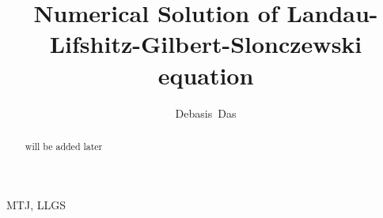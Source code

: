 \documentclass[review]{elsarticle}
\begin{document}
\begin{frontmatter}

\title{Numerical Solution of Landau-Lifshitz-Gilbert-Slonczewski equation}

\author{Debasis~Das}
\address{Department of Electrical and Computer Engineering, National University of Singapore}

%

%
\begin{abstract}
	will be added later
\end{abstract}

\begin{keyword}
	MTJ, LLGS
\end{keyword}

\end{frontmatter}

\end{document}
